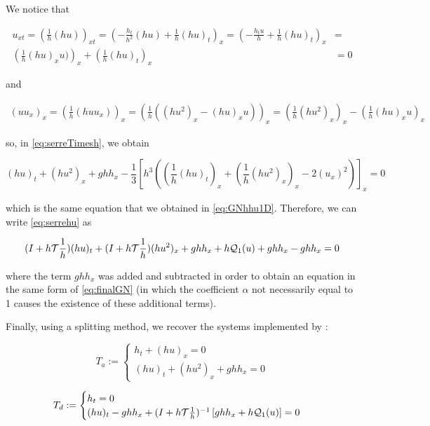 \indent We notice that

\begin{equation}
	\begin{split}
	u_{xt} = \left(\frac{1}{h} (hu) \right)_{xt} = \left( -\frac{h_t}{h^2}(hu) + \frac{1}{h}(hu)_t  \right)_x = \left( -\frac{h_tu}{h} + \frac{1}{h}(hu)_t  \right)_x &= \\ \left( \frac{1}{h} (hu)_xu) \right)_x  + \left( \frac{1}{h}(hu)_t  \right)_x &=0
	\end{split}
\end{equation}

and

\begin{equation}
	\begin{split}
	(uu_x)_x = \left(  \frac{1}{h} (huu_x) \right)_x = \left(  \frac{1}{h} ((hu^2)_x - (hu)_xu) \right)_x = \left( \frac{1}{h} (hu^2)_x \right)_x - \left( \frac{1}{h} (hu)_xu \right)_x
	\end{split}
\end{equation}

\noindent so, in \eqref{eq:serreTimesh}, we obtain

\begin{equation}
	\label{eq:serrehu}
	(hu)_t  + (hu^2)_x + ghh_x - \frac{1}{3}\left[h^3 \left( \left( \frac{1}{h}(hu)_t  \right)_x  + \left( \frac{1}{h} (hu^2)_x \right)_x  - 2(u_x)^2  \right) \right]_x = 0
\end{equation}

\indent which is the same equation that we obtained in \eqref{eq:GNhhu1D}. Therefore, we can write \eqref{eq:serrehu} as

\begin{equation}
	(I + h\mathcal{T}\frac{1}{h}) (hu)_t + (I + h\mathcal{T}\frac{1}{h})(hu^2)_x + ghh_x + h\mathcal{Q}_1(u) + ghh_x - ghh_x= 0
\end{equation}

\noindent where the term $ghh_x$ was added and subtracted in order to obtain an equation in the same form of \eqref{eq:finalGN} (in which the coefficient $\alpha$ not necessarily equal to 1 causes the existence of these additional terms).

\indent Finally, using a splitting method, we recover the systems implemented by \cite{Bonneton2011} :

\begin{equation}
	\label{eq:splitSerre1}
	T_a := \begin{cases}
		h_t + (hu)_x = 0 \\
		(hu)_t + (hu^2)_x + ghh_x = 0 
	\end{cases}	
\end{equation}

\begin{equation}
	\label{eq:splitSerre2}
	T_d := \begin{cases}
		h_t = 0 \\
		(hu)_t  -ghh_x + (I + h\mathcal{T}\frac{1}{h})^{-1}\left[ ghh_x + h\mathcal{Q}_1(u) \right] = 0
	\end{cases}	
\end{equation}

